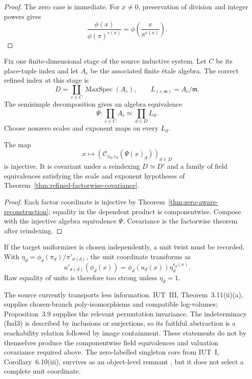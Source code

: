 \begin{proof}
The zero case is immediate.  For $x\ne0$, preservation of division and
integer powers gives
\[
 \frac{\phi(x)}{\phi(\pi)^{e(x)}}
 =\phi\left(\frac{x}{\pi^{e(x)}}\right).
\]
\end{proof}

Fix one finite-dimensional stage of the source inductive system.  Let $C$ be
its place-tuple index and let $A_c$ be the associated finite \'{e}tale algebra.
The correct refined index at this stage is
\[
 D=\coprod_{c\in C}\operatorname{MaxSpec}(A_c),
 \qquad L_{(c,\mathfrak m)}=A_c/\mathfrak m.
\]
The semisimple decomposition gives an algebra equivalence
\[
 \Psi:\prod_{c\in C}A_c\simeq\prod_{d\in D}L_d.
\]
Choose nonzero scales and exponent maps on every $L_d$.

\begin{corollary}
\label{cor:faithful-refined-packet-signature}
The map
\[
 x\longmapsto
 \left(\mathcal C_{\pi_d,e_d}(\Psi(x)_d)\right)_{d\in D}
\]
is injective.  It is covariant under a reindexing $D\simeq D'$ and a family
of field equivalences satisfying the scale and exponent hypotheses of
Theorem~\ref{thm:refined-factorwise-covariance}.
\end{corollary}

\begin{proof}
Each factor coordinate is injective by
Theorem~\ref{thm:zero-aware-reconstruction}; equality in the dependent
product is componentwise.  Compose with the injective algebra equivalence
$\Psi$.  Covariance is the factorwise theorem after reindexing.
\end{proof}

If the target uniformizer is chosen independently, a unit twist must be
recorded.  With
$\eta_d=\phi_d(\pi_d)/\pi'_{\sigma(d)}$, the unit coordinate transforms as
\[
 u'_{\sigma(d)}(\phi_d(x))
 =\phi_d(u_d(x))\eta_d^{e_d(x)}.
\]
Raw equality of units is therefore too strong unless $\eta_d=1$.

The source currently transports less information.  IUT~III,
Theorem~3.11(ii)(a), supplies chosen-branch poly-isomorphisms and compatible
log-volumes; Proposition~3.9 supplies the relevant permutation invariance.
The indeterminacy (Ind3) is described by inclusions or surjections, so its
faithful abstraction is a reachability relation followed by image
containment.  These statements do not by themselves produce the
componentwise field equivalences and valuation covariance required above.
The zero-labelled singleton core from IUT~I, Corollary~6.10(iii), survives as
an object-level remnant \cite{IUT1}, but it does not select a complete unit
coordinate.

